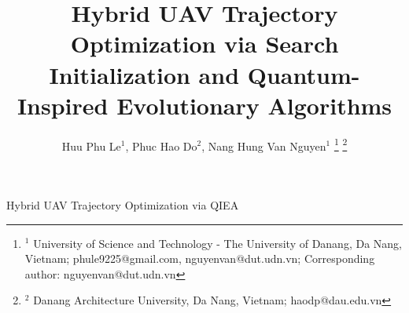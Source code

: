 
\usepackage{subcaption} 
\renewcommand{\thealgorithm}{Algorithm~\arabic{algorithm}}
\makeatletter	   %
\setcounter{page}{1}
\renewcommand{\ps@plain}{%
\renewcommand{\@oddhead}{\hfill\begin{tabular}{r}
\small{\emph{Journal of Computer Science and Cybernetics, V.xx, N.xx (2026), 1--}} \\
\footnotesize{DOI:~10.15625/1813-9663/xx/x/xxxx}
\end{tabular}
}

    \renewcommand{\@evenhead}{\@oddhead}%
    \renewcommand{\@oddfoot}{\small\hfill{\copyright\ 2026 Vietnam  Academy of Science \& Technology}}%
    \renewcommand{\@evenfoot}{\@oddfoot}}
    \makeatother     %
    


\title{Hybrid UAV Trajectory Optimization via Search Initialization and Quantum-Inspired Evolutionary Algorithms}

\author{
    Huu Phu Le$^{1}$, 
    Phuc Hao Do$^{2}$, 
    Nang Hung Van Nguyen$^{1}$
    \thanks{$^{1}$ University of Science and Technology - The University of Danang, Da Nang, Vietnam; phule9225@gmail.com, nguyenvan@dut.udn.vn; Corresponding author: nguyenvan@dut.udn.vn}
    \thanks{$^{2}$ Danang Architecture University, Da Nang, Vietnam; haodp@dau.edu.vn}
}

\maketitle

{\footnotesize \chu Hybrid UAV Trajectory Optimization via QIEA}

